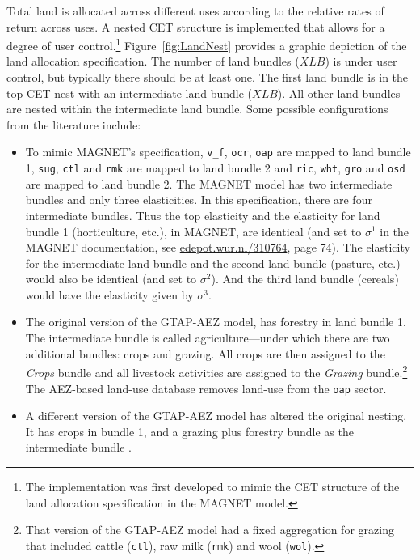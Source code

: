 \documentclass[11pt,letterpaper]{report}
\begin{document}
Total land is allocated across different uses according to the relative rates of
return across uses. A nested CET structure is implemented that allows for a
degree of user control.\footnote{The implementation was first developed to mimic
the CET structure of the land allocation specification in the MAGNET model.}
Figure~\ref{fig:LandNest} provides a graphic depiction of the land allocation
specification. The number of land bundles ($\mathit{XLB}$) is under user
control, but typically there should be at least one. The first land bundle is in
the top CET nest with an intermediate land bundle ($\mathit{XLB}$). All other
land bundles are nested within the intermediate land bundle. Some possible
configurations from the literature include:

\begin{itemize}
\item{To mimic
MAGNET's specification, \texttt{v\_f}, \texttt{ocr}, \texttt{oap} are mapped
to land bundle 1, \texttt{sug}, \texttt{ctl} and \texttt{rmk} are mapped to land
bundle 2 and \texttt{ric}, \texttt{wht}, \texttt{gro} and \texttt{osd} are
mapped to land bundle 2. The MAGNET model has two intermediate bundles and only
three elasticities. In this specification, there are four intermediate bundles.
Thus the top elasticity and the elasticity for land bundle 1
(horticulture, etc.), in MAGNET, are identical (and set to $\sigma^1$ in the
MAGNET documentation, see \url{edepot.wur.nl/310764}, page 74).
The elasticity
for the intermediate land bundle and the second land bundle (pasture, etc.)
would also be identical (and set to $\sigma^2$). And the third land bundle
(cereals) would have the elasticity given by $\sigma^3$.}
\item{The original version of the GTAP-AEZ model, \citep{HerteletalChap62009}
has forestry in land bundle 1. The intermediate bundle is called
agriculture---under which there are two additional bundles: crops
and grazing. All crops are then assigned to the \emph{Crops} bundle
and all livestock activities are assigned to the \emph{Grazing} bundle.\footnote{That
version of the GTAP-AEZ model had a fixed aggregation for grazing that
included cattle (\texttt{ctl}), raw milk (\texttt{rmk}) and wool (\texttt{wol}).}
The AEZ-based land-use database removes land-use from the \texttt{oap} sector.}
\item{A different version of the GTAP-AEZ model has altered the
original nesting. It has crops in bundle 1, and a grazing plus forestry
bundle as the intermediate bundle \citep{StevensonetalPNAS2013}.}
\end{itemize}
\end{document}

